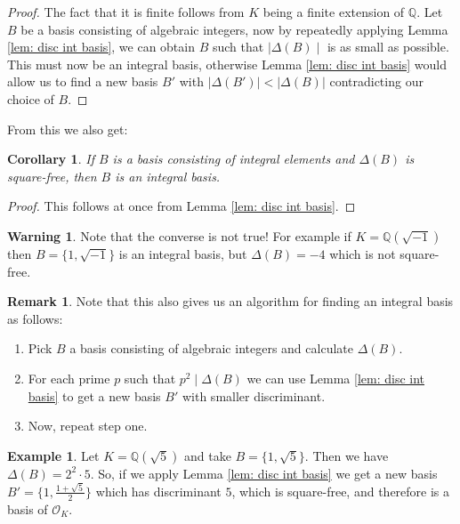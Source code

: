 \documentclass[11pt,a4paper]{report}
\theoremstyle{plain}
\newtheorem{cor}[subsection]{Corollary}
\theoremstyle{definition}
\newtheorem{exmp}[subsection]{Example}
\theoremstyle{definition}
\newtheorem{rmrk}[subsection]{Remark}
\newtheorem{warn}[subsection]{Warning}
\def\QQ{\mathbb{Q}}
\def \OO {\mathcal{O}}
\begin{document}
	\begin{proof}
		The fact that it is finite follows from $K$ being a finite extension of $\QQ$.	
		Let $B$ be a basis consisting of algebraic integers, now by repeatedly applying Lemma \ref{lem: disc int basis}, we can obtain $B$ such that $\mid \Delta(B) \mid $ is as small as possible. This must now be an integral basis, otherwise Lemma \ref{lem: disc int basis} would allow us to find a new basis $B'$ with $|\Delta(B')| < |\Delta(B)|$ contradicting our choice of $B$. 
	\end{proof}
	
	From this we also get:
	\begin{cor}\label{cor: square free implies int basis}
		If $B$ is a basis consisting of integral elements and $\Delta(B)$ is square-free, then $B$ is an integral basis.
	\end{cor}
	
	\begin{proof}
		This follows at once from Lemma \ref{lem: disc int basis}.
	\end{proof}
	
	
	\begin{warn}
		Note that the converse is not true! For example if $K=\QQ(\sqrt{-1})$ then $B=\{1,\sqrt{-1}\}$ is an integral basis, but $\Delta(B)=-4$ which is not square-free.
	\end{warn}
	\begin{rmrk}
		Note that this also gives us an algorithm for finding an integral basis as follows:
		\begin{enumerate}
			\item Pick $B$ a basis consisting of algebraic integers and calculate $\Delta(B)$.
			\item For each prime $p$ such that $p^2 \mid \Delta(B)$ we can use Lemma \ref{lem: disc int basis} to get a new basis $B'$ with smaller discriminant.
			\item Now, repeat step one.
		\end{enumerate}
	\end{rmrk}
	
	\begin{exmp}
		Let $K=\QQ(\sqrt{5})$ and take $B=\{1,\sqrt{5}\}$. Then we have $\Delta(B)=2^2\cdot5$. So, if we apply Lemma \ref{lem: disc int basis} we get a new basis $B'=\{1,\frac{1+\sqrt{5}}{2}\}$ which has discriminant $5$, which is square-free, and therefore is  a basis of $\OO_K$.
	\end{exmp}
	
	
	
\end{document}
